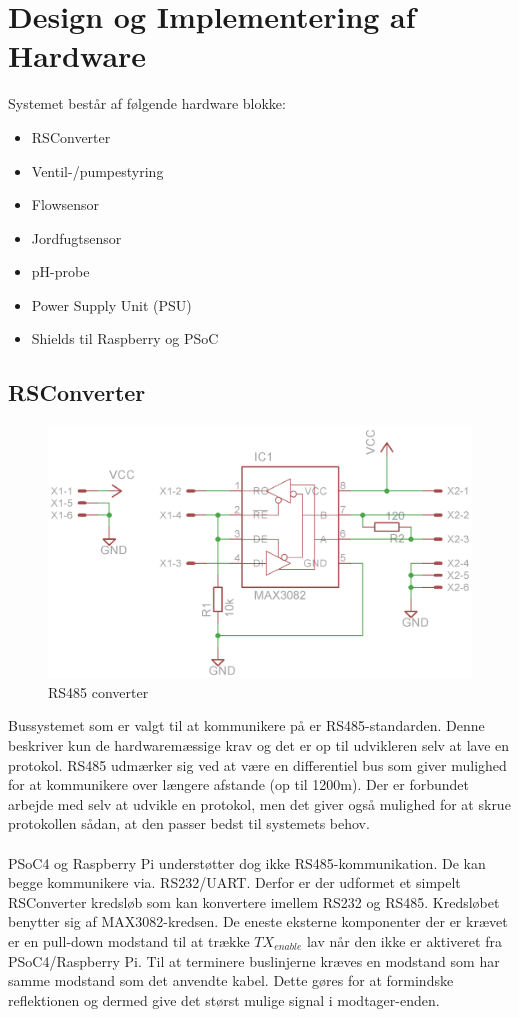 \section{Design og Implementering af Hardware}
Systemet består af følgende hardware blokke:
\begin{itemize}
\item RSConverter
\item Ventil-/pumpestyring
\item Flowsensor
\item Jordfugtsensor
\item pH-probe
\item Power Supply Unit (PSU)
\item Shields til Raspberry og PSoC
\end{itemize}

\subsection{RSConverter}
\begin{figure}[H]
	\centering
	\includegraphics[scale=1]{Projektbeskrivelse/DesignOgImplementeringAfHW/RS485_Converter/Schematic}
	\caption{RS485 converter}
	\label{photo:RS485converter}
\end{figure}

Bussystemet som er valgt til at kommunikere på er RS485-standarden. Denne beskriver kun de hardwaremæssige krav og det er op til udvikleren selv at lave en protokol. RS485 udmærker sig ved at være en differentiel bus som giver mulighed for at kommunikere over længere afstande (op til 1200m). Der er forbundet arbejde med selv at udvikle en protokol, men det giver også mulighed for at skrue protokollen sådan, at den passer bedst til systemets behov.
\\\\
PSoC4 og Raspberry Pi understøtter dog ikke RS485-kommunikation. De kan begge kommunikere via. RS232/UART. Derfor er der udformet et simpelt RSConverter kredsløb som kan konvertere imellem RS232 og RS485. Kredsløbet benytter sig af MAX3082-kredsen. De eneste eksterne komponenter der er krævet er en pull-down modstand til at trække $TX_{enable}$ lav når den ikke er aktiveret fra PSoC4/Raspberry Pi. Til at terminere buslinjerne kræves en modstand som har samme modstand som det anvendte kabel. Dette gøres for at formindske reflektionen og dermed give det størst mulige signal i modtager-enden.

